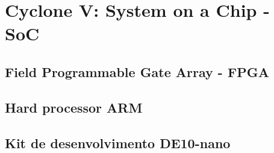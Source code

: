 \chapter{Cyclone V: System on a Chip - SoC}


\section{Field Programmable Gate Array - FPGA}

\section{Hard processor ARM}

\section{Kit de desenvolvimento DE10-nano}